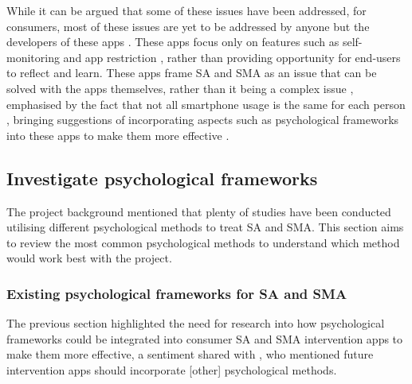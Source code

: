 \documentclass[12pt]{article}
\begin{document}
While it can be argued that some of these issues have been addressed, for consumers, most of
these issues are yet to be addressed by anyone but the developers of these apps 
\autocite{RefWorks:RefID:35-dosselaar2017smartphone}. These apps focus only on features
such as self-monitoring and app restriction \autocite{RefWorks:RefID:74-löchtefeld2013appdetox}, rather than 
providing opportunity for end-users to reflect and learn. These apps frame SA and SMA as an issue 
that can be solved with the apps themselves, rather than it being a complex issue
\autocite{RefWorks:RefID:128-santhosh2025augmented}, emphasised by the fact that not all smartphone usage 
is the same for each person \autocite{RefWorks:RefID:126-petrucco2021user}, bringing suggestions of
incorporating aspects such as psychological frameworks into these apps to make them more effective 
\autocite{RefWorks:RefID:35-dosselaar2017smartphone}.


\subsection{Investigate psychological frameworks} %
The project background mentioned that plenty of studies have been conducted utilising different
psychological methods to treat SA and SMA. This section aims to review the most common psychological methods
to understand which method would work best with the project.




\subsubsection{Existing psychological frameworks for SA and SMA}
The previous section highlighted the need for research into how psychological frameworks could be integrated into 
consumer SA and SMA intervention apps to make them more effective, a sentiment shared with 
\textcite{RefWorks:RefID:75-oliveira2021effectiveness}, who mentioned future intervention apps should 
incorporate [other] psychological methods. \newline
\end{document}
